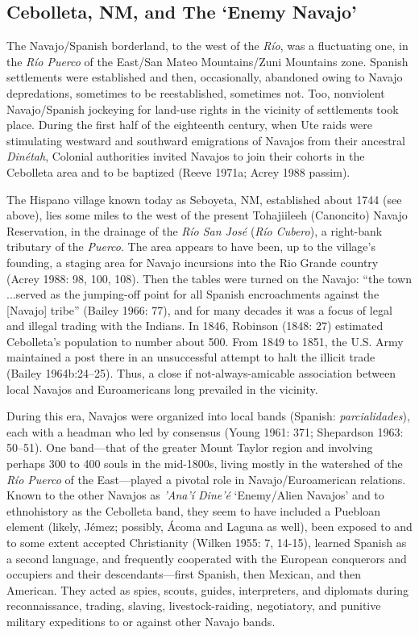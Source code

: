 \subsection{Cebolleta, NM, and The ‘Enemy Navajo’}
The Navajo/Spanish borderland, to the west of the \textit{Río}, was a fluctuating one, in the \textit{Río Puerco} of the East/San Mateo Mountains/Zuni Mountains zone.  Spanish settlements were established and then, occasionally, abandoned owing to Navajo depredations, sometimes to be reestablished, sometimes not.  Too, nonviolent Navajo/Spanish jockeying for land-use rights in the vicinity of settlements took place.  During the first half of the eighteenth century, when Ute raids were stimulating westward and southward emigrations of Navajos from their ancestral \textit{Dinétah}, Colonial authorities invited Navajos to join their cohorts in the Cebolleta area and to be baptized (Reeve 1971a; Acrey 1988 passim).

  The Hispano village known today as Seboyeta, NM, established about 1744 (see above), lies some miles to the west of the present Tohajiileeh (Canoncito) Navajo Reservation, in the drainage of the \textit{Río San José} (\textit{Río Cubero}), a right-bank tributary of the \textit{Puerco}.  The area appears to have been, up to the village’s founding, a staging area for Navajo incursions into the Rio Grande country (Acrey 1988: 98, 100, 108).  Then the tables were turned on the Navajo: “the town ...served as the jumping-off point for all Spanish encroachments against the [Navajo] tribe” (Bailey 1966: 77), and for many decades it was a focus of legal and illegal trading with the Indians.  In 1846, Robinson (1848: 27) estimated Cebolleta’s population to number about 500.  From 1849 to 1851, the U.S. Army maintained a post there in an unsuccessful attempt to halt the illicit trade (Bailey 1964b:24–25).  Thus, a close if not-always-amicable association between local Navajos and Euroamericans long prevailed in the vicinity.

  During this era, Navajos were organized into local bands (Spanish: \textit{parcialidades}), each with a headman who led by consensus (Young 1961: 371; Shepardson 1963: 50–51).  One band—that of the greater Mount Taylor region and involving perhaps 300 to 400 souls in the mid-1800s, living mostly in the watershed of the \textit{Río Puerco} of the East—played a pivotal role in Navajo/Euroamerican relations.  Known to the other Navajos as \textit{’Ana’í Dine’é} ‘Enemy/Alien Navajos’ and to ethnohistory as the Cebolleta band, they seem to have included a Puebloan element (likely, Jémez; possibly, Ácoma and Laguna as well), been exposed to and to some extent accepted Christianity (Wilken 1955: 7, 14-15), learned Spanish as a second language, and frequently cooperated with the European conquerors and occupiers and their descendants—first Spanish, then Mexican, and then American.  They acted as spies, scouts, guides, interpreters, and diplomats during reconnaissance, trading, slaving, livestock-raiding, negotiatory, and punitive military expeditions to or against other Navajo bands.

